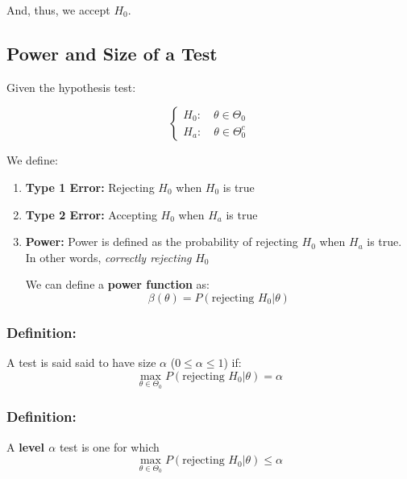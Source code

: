 \documentclass{article}
\begin{document}
    And, thus, we accept $H_0$.
    
    \subsection{Power and Size of a Test}
    
    Given the hypothesis test:
    
    \begin{equation*}
        \begin{cases}
            H_0: \quad \theta \in \Theta_0\\
            H_a: \quad \theta \in \Theta_0^c
        \end{cases}
    \end{equation*}
    
    We define:
    \begin{enumerate}
        \item \textbf{Type 1 Error:} Rejecting $H_0$ when $H_0$ is true
        \item \textbf{Type 2 Error:} Accepting $H_0$ when $H_a$ is true
        \item \textbf{Power:} Power is defined as the probability of rejecting $H_0$ when $H_a$ is true. In other words, \textit{correctly rejecting} $H_0$
        
            We can define a \textbf{power function} as:
            \begin{equation*}
                \beta(\theta) = P(\text{rejecting } H_0 | \theta)
            \end{equation*}
    \end{enumerate}

    \subsubsection*{Definition:}
    
    A test is said said to have size $\alpha$ ($0\leq\alpha\leq 1$) if:
    \begin{equation*}
        \max_{\theta\in\Theta_0} P(\text{rejecting } H_0 | \theta) = \alpha
    \end{equation*}
    
    \subsubsection*{Definition:}
    
    A \textbf{level $\alpha$} test is one for which
    \begin{equation*}
        \max_{\theta\in\Theta_0} P(\text{rejecting } H_0 | \theta) \leq \alpha
    \end{equation*}
    
\end{document}
